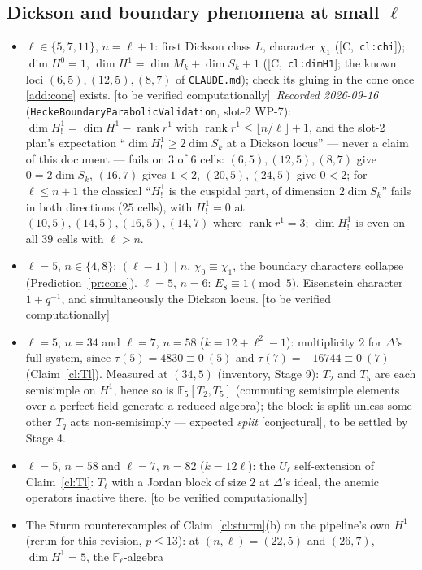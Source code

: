 \documentclass[11pt]{article}
\theoremstyle{remark}
\newcommand{\F}{\mathbb{F}}
\newcommand{\De}{\Delta}
\newcommand{\Fl}{\F_\ell}
\DeclareMathOperator{\rank}{rank}
\newcommand{\HA}[1]{[C,~\texttt{#1}]}      %
\newcommand{\CONJ}{\textsf{[conjectural]}}
\newcommand{\VERIFY}{\textsf{[to be verified computationally]}}
\begin{document}
\subsection{Dickson and boundary phenomena at small \texorpdfstring{$\ell$}{l}}
\begin{itemize}
\item $\ell\in\{5,7,11\}$, $n=\ell+1$: first Dickson class $L$, character $\chi_1$
  (\HA{cl:chi}); $\dim H^0=1$, $\dim H^1=\dim M_k+\dim S_k+1$ (\HA{cl:dimH1}; the
  known loci $(6,5),(12,5),(8,7)$ of \texttt{CLAUDE.md}); check its gluing in the cone once
  \ref{add:cone} exists. \VERIFY\ \emph{Recorded 2026-09-16}
  (\texttt{HeckeBoundaryParabolicValidation}, slot-2 WP-7): $\dim H^1_!=\dim H^1-\rank r^1$ with
  $\rank r^1\le\lfloor n/\ell\rfloor+1$, and the slot-2 plan's expectation ``$\dim H^1_!\ge
  2\dim S_k$ at a Dickson locus'' --- never a claim of this document --- fails on $3$ of $6$
  cells: $(6,5),(12,5),(8,7)$ give $0=2\dim S_k$, $(16,7)$ gives $1<2$, $(20,5),(24,5)$ give
  $0<2$; for $\ell\le n+1$ the classical ``$H^1_!$ is the cuspidal part, of dimension
  $2\dim S_k$'' fails in both directions ($25$ cells), with $H^1_!=0$ at
  $(10,5),(14,5),(16,5),(14,7)$ where $\rank r^1=3$; $\dim H^1_!$ is even on all $39$ cells with
  $\ell>n$.
\item $\ell=5$, $n\in\{4,8\}$: $(\ell-1)\mid n$, $\chi_0\equiv\chi_1$, the boundary characters
  collapse (Prediction~\ref{pr:cone}). $\ell=5$, $n=6$: $E_8\equiv1\pmod5$, Eisenstein character
  $1+q^{-1}$, and simultaneously the Dickson locus. \VERIFY
\item $\ell=5$, $n=34$ and $\ell=7$, $n=58$ ($k=12+\ell^2-1$): multiplicity $2$ for $\De$'s
  full system, since $\tau(5)=4830\equiv0\ (5)$ and $\tau(7)=-16744\equiv0\ (7)$
  (Claim~\ref{cl:Tl}). Measured at $(34,5)$ (inventory, Stage 9): $T_2$ and $T_5$ are each
  semisimple on $H^1$, hence so is $\F_5[T_2,T_5]$ (commuting semisimple elements over a perfect
  field generate a reduced algebra); the block is split unless some other $T_q$ acts
  non-semisimply --- expected \emph{split} \CONJ, to be settled by Stage 4.
\item $\ell=5$, $n=58$ and $\ell=7$, $n=82$ ($k=12\ell$): the $U_\ell$ self-extension of
  Claim~\ref{cl:Tl}: $T_\ell$ with a Jordan block of size $2$ at $\De$'s ideal, the anemic
  operators inactive there. \VERIFY
\item The Sturm counterexamples of Claim~\ref{cl:sturm}(b) on the pipeline's own $H^1$ (rerun
  for this revision, $p\le13$): at $(n,\ell)=(22,5)$ and $(26,7)$, $\dim H^1=5$, the $\Fl$-algebra

\end{itemize}
\end{document}
